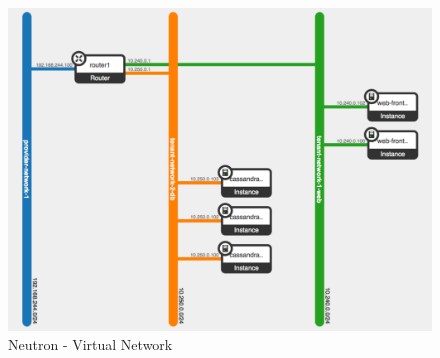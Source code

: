 \documentclass{article}
\begin{document}
\begin{figure}[H]
    \centering
    \includegraphics[scale=0.4]{img/neutron virtual network.png}
    \caption{Neutron - Virtual Network}
\end{figure}\noindent
\end{document}
